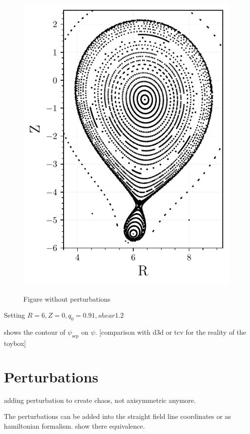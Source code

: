 \begin{figure}[h!]
\begin{minipage}{0.5\textwidth}
{            \includegraphics[width=\textwidth]{images/plots/toytok/poincare.pdf}
        }
    \end{minipage}
    \caption{Figure without perturbations}
    \label{fig:basis}
\end{figure}

Setting 
$R = 6, Z = 0, q_0 = 0.91, shear 1.2$

 shows the contour of $\psi_\text{sep}$ on $\psi$.
[comparison with d3d or tcv for the reality of the toybox]

\section{Perturbations}
adding perturbation to create chaos, not axisymmetric anymore.

The perturbations can be added into the straight field line coordinates or as hamiltonian formalism. show there equivalence.

